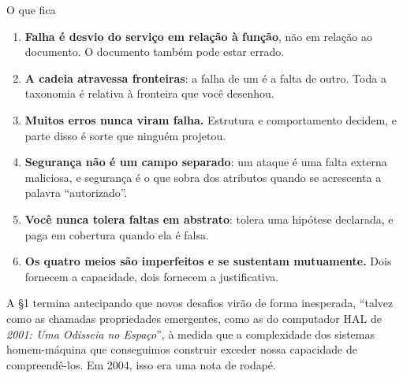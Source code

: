 \documentclass{beamer}
\begin{document}
\begin{frame}{O que fica}
    \footnotesize
    \begin{enumerate}
        \item \textbf{Falha \'e desvio do servi\c{c}o em rela\c{c}\~ao \`a fun\c{c}\~ao}, n\~ao em rela\c{c}\~ao ao documento. O documento tamb\'em pode estar errado.
        \item \textbf{A cadeia atravessa fronteiras}: a falha de um \'e a falta de outro. Toda a taxonomia \'e relativa \`a fronteira que voc\^e desenhou.
        \item \textbf{Muitos erros nunca viram falha.} Estrutura e comportamento decidem, e parte disso \'e sorte que ningu\'em projetou.
        \item \textbf{Seguran\c{c}a n\~ao \'e um campo separado}: um ataque \'e uma falta externa maliciosa, e seguran\c{c}a \'e o que sobra dos atributos quando se acrescenta a palavra ``autorizado''.
        \item \textbf{Voc\^e nunca tolera faltas em abstrato}: tolera uma hip\'otese declarada, e paga em cobertura quando ela \'e falsa.
        \item \textbf{Os quatro meios s\~ao imperfeitos e se sustentam mutuamente.} Dois fornecem a capacidade, dois fornecem a justificativa.
    \end{enumerate}
    \medskip
    \begin{ancora}
        \footnotesize
        A \S1 termina antecipando que novos desafios vir\~ao de forma inesperada, ``talvez como as chamadas propriedades emergentes, como as do computador HAL de \textit{2001: Uma Odisseia no Espa\c{c}o}'', \`a medida que a complexidade dos sistemas homem-m\'aquina que conseguimos construir exceder nossa capacidade de compreend\^e-los. Em 2004, isso era uma nota de rodap\'e.
    \end{ancora}
\end{frame}
\end{document}
